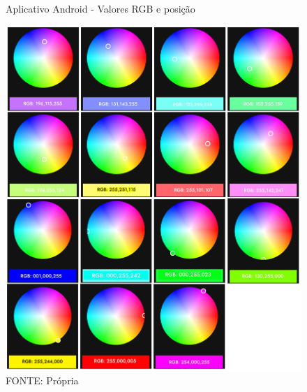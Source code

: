 \begin{figure}[ht]
	\centering
	\caption{Aplicativo Android - Valores RGB e posição}
	\includegraphics[width=1.0\textwidth]{figures/example_1_arduino_color}
	\caption*{FONTE: Própria}
	\label{hsv_exemplo_1}
\end{figure}


